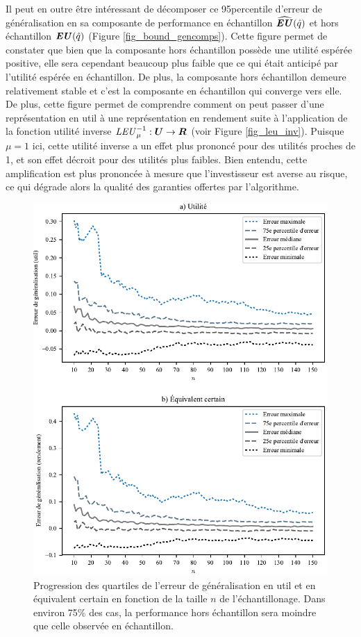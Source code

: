 Il peut en outre être intéressant de décomposer ce 95\ieme percentile d'erreur de
généralisation en sa composante de performance en échantillon $\operatorname{\widehat{\operatorname{\mbox{\textbf{\textit{EU}}}}}}(\hat q)$ et hors
échantillon $\operatorname{\mbox{\textbf{\textit{EU}}}}(\hat q)$ (Figure \ref{fig_bound_gencomps}). Cette figure permet de constater
que bien que la composante hors échantillon possède une utilité espérée positive, elle
sera cependant beaucoup plus faible que ce qui était anticipé par l'utilité espérée en
échantillon. De plus, la composante hors échantillon demeure relativement stable et c'est
la composante en échantillon qui converge vers elle. De plus, cette figure permet de
comprendre comment on peut passer d'une représentation en util à une représentation en
rendement suite à l'application de la fonction utilité inverse $\mbox{\textit{LEU}}^{-1}_\mu:\bm{U} \to \bm{R}$
(voir Figure \ref{fig_leu_inv}). Puisque $\mu=1$ ici, cette utilité inverse a un effet plus
prononcé pour des utilités proches de 1, et son effet décroit pour des utilités plus
faibles. Bien entendu, cette amplification est plus prononcée à mesure que l'investisseur
est averse au risque, ce qui dégrade alors la qualité des garanties offertes par
l'algorithme.


\newpage


\begin{figure}[h!]
  \centering
  \includegraphics[width=\textwidth]{../experiments/fig/genstats.pdf}
  \caption[Quartiles de l'erreur de généralisation]{Progression des quartiles de l'erreur
    de généralisation en util et en équivalent certain en fonction de la taille $n$ de
    l'échantillonage. Dans environ 75\% des cas, la performance hors échantillon sera
    moindre que celle observée en échantillon. }
  \label{fig_genstats}
\end{figure}


